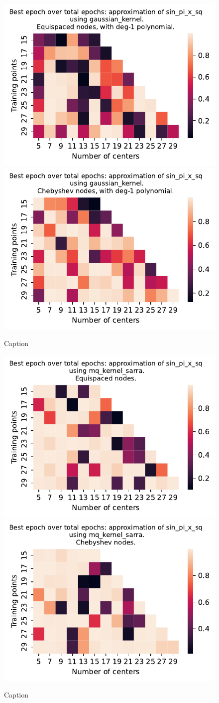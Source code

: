 \documentclass[12pt]{report} %
\begin{document}
\begin{figure}[ht]
    \centering
    
    \includegraphics[width=.49\textwidth]{imagenes/experiments/1d/variational_epochs/sin_pi_x_sq-Kgaussian_kernel-Poly-Equi-epochs.pdf}
    \includegraphics[width=.49\textwidth]{imagenes/experiments/1d/variational_epochs/sin_pi_x_sq-Kgaussian_kernel-Poly-Cheb-epochs.pdf}
    \caption{Caption}
    \label{fig:epochs-sin-pi-x-sq-gaussian-poly}
\end{figure}


\begin{figure}[ht]
    \centering
    
    \includegraphics[width=.49\textwidth]{imagenes/experiments/1d/variational_epochs/sin_pi_x_sq-Kmq_kernel_sarra-Equi-epochs.pdf}
    \includegraphics[width=.49\textwidth]{imagenes/experiments/1d/variational_epochs/sin_pi_x_sq-Kmq_kernel_sarra-Cheb-epochs.pdf}
    \caption{Caption}
    \label{fig:epochs-sin-pi-x-sq-sarra}
\end{figure}
\end{document}
